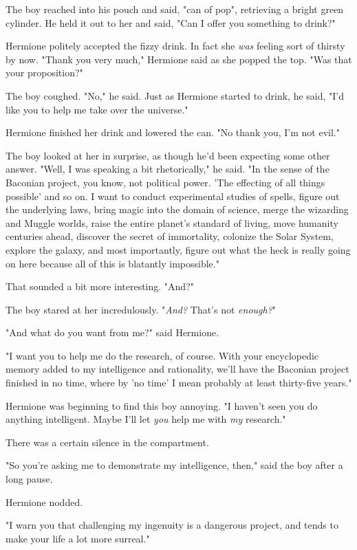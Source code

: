 The boy reached into his pouch and said, "can of pop", retrieving a bright green cylinder. He held it out to her and said, "Can I offer you something to drink?"

Hermione politely accepted the fizzy drink. In fact she \emph{was} feeling sort of thirsty by now. "Thank you very much," Hermione said as she popped the top. "Was that your proposition?"

The boy coughed. "No," he said. Just as Hermione started to drink, he said, "I'd like you to help me take over the universe."

Hermione finished her drink and lowered the can. "No thank you, I'm not evil."

The boy looked at her in surprise, as though he'd been expecting some other answer. "Well, I was speaking a bit rhetorically," he said. "In the sense of the Baconian project, you know, not political power. 'The effecting of all things possible' and so on. I want to conduct experimental studies of spells, figure out the underlying laws, bring magic into the domain of science, merge the wizarding and Muggle worlds, raise the entire planet's standard of living, move humanity centuries ahead, discover the secret of immortality, colonize the Solar System, explore the galaxy, and most importantly, figure out what the heck is really going on here because all of this is blatantly impossible."

That sounded a bit more interesting. "And?"

The boy stared at her incredulously. "\emph{And?} That's not \emph{enough?}"

"And what do you want from me?" said Hermione.

"I want you to help me do the research, of course. With your encyclopedic memory added to my intelligence and rationality, we'll have the Baconian project finished in no time, where by 'no time' I mean probably at least thirty-five years."

Hermione was beginning to find this boy annoying. "I haven't seen you do anything intelligent. Maybe I'll let \emph{you} help me with \emph{my} research."

There was a certain silence in the compartment.

"So you're asking me to demonstrate my intelligence, then," said the boy after a long pause.

Hermione nodded.

"I warn you that challenging my ingenuity is a dangerous project, and tends to make your life a lot more surreal."


